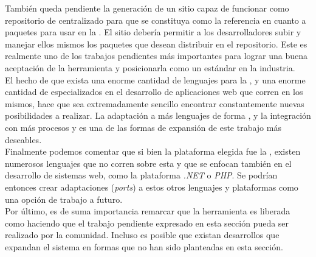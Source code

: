 También queda pendiente la generación de un sitio capaz de funcionar como
repositorio de \dependencies centralizado para que se constituya como la
referencia en cuanto a paquetes para usar en la \viewtier. El sitio debería
permitir a los desarrolladores subir y manejar ellos mismos los paquetes que
desean distribuir en el repositorio. Este es realmente uno de los trabajos 
pendientes más importantes para lograr una buena aceptación de la herramienta y 
posicionarla como un estándar en la industria.\\
El hecho de que exista una enorme cantidad de lenguajes para la \jvm, y una 
enorme cantidad de \frameworks especializados en el desarrollo de aplicaciones 
web que corren en los mismos, hace que sea extremadamente sencillo encontrar 
constantemente nuevas posibilidades a realizar. La adaptación a más lenguajes 
de forma , y la integración con más procesos y \frameworks es 
una de las formas de expansión de este trabajo más deseables.\\
Finalmente podemos comentar que si bien la plataforma elegida fue la \jvm,
existen numerosos lenguajes que no corren sobre esta y que se enfocan también
en el desarrollo de sistemas web, como la plataforma \emph{.NET} o \emph{PHP}.
Se podrían entonces crear adaptaciones (\emph{ports}) a estos otros lenguajes y
plataformas como una opción de trabajo a futuro.\\
Por último, es de suma importancia remarcar que la herramienta es liberada como
\freesoft haciendo que el trabajo pendiente expresado en esta sección pueda ser
realizado por la comunidad. Incluso es posible que existan desarrollos que 
expandan el sistema en formas que no han sido planteadas en esta sección.\\
